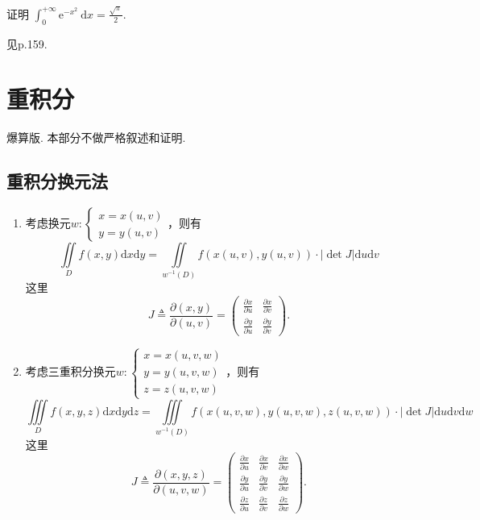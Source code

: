 \begin{example}
    证明 $\int_0^{+\infty} \mathrm{e}^{-x^2} \mathrm{~d} x=\frac{\sqrt{\pi}}{2} .$
\end{example}
\begin{solution}
    见\cite{崔尚斌}p.159.
\end{solution}

\section{重积分}

爆算版. 本部分不做严格叙述和证明.

\subsection{重积分换元法}

\begin{theorem}[重积分换元法]\label{thm:multiple-integral-change-of-variable}
    \begin{enumerate}
        \item 考虑换元$w:\left\{\begin{array}{l}x=x(u,v)\\y=y(u,v)\end{array}\right.$，则有
        \[
            \iint\limits_D f(x,y)\mathrm{d}x\mathrm{d}y=\iint\limits_{w^{-1}(D)}f(x(u,v),y(u,v))\cdot|\operatorname{det}J|\mathrm{d}u\mathrm{d}v
        \]
        这里
        \[
            J\triangleq\frac{\partial(x,y)}{\partial(u,v)}=\left(\begin{array}{ll}
                \frac{\partial x}{\partial u} & \frac{\partial x}{\partial v}\\
                \frac{\partial y}{\partial u} & \frac{\partial y}{\partial v}
            \end{array}\right).
        \]

        \item 考虑三重积分换元$w:\left\{\begin{array}{l}x=x(u,v,w)\\y=y(u,v,w)\\z=z(u,v,w)\end{array}\right.$，则有
        \[
            \iiint\limits_D f(x,y,z)\mathrm{d}x\mathrm{d}y\mathrm{d}z=\iiint\limits_{w^{-1}(D)}f(x(u,v,w),y(u,v,w),z(u,v,w))\cdot|\operatorname{det}J|\mathrm{d}u\mathrm{d}v\mathrm{d}w
        \]
        这里
        \[
            J\triangleq\frac{\partial(x,y,z)}{\partial(u,v,w)}=\left(\begin{array}{lll}
                \frac{\partial x}{\partial u} & \frac{\partial x}{\partial v} & \frac{\partial x}{\partial w}\\
                \frac{\partial y}{\partial u} & \frac{\partial y}{\partial v} & \frac{\partial y}{\partial w}\\
                \frac{\partial z}{\partial u} & \frac{\partial z}{\partial v} & \frac{\partial z}{\partial w}
            \end{array}\right).
        \]
    \end{enumerate}
\end{theorem}

